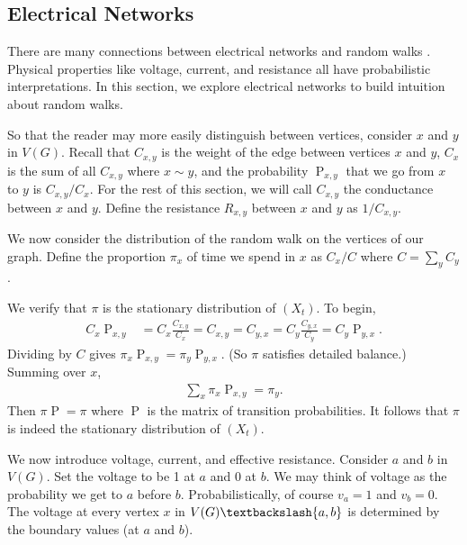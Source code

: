 \documentclass[12pt]{article}
\theoremstyle{definition}
\DeclareMathOperator{\pr}{\mathrm{P}}		     %
\begin{document}
\subsection{Electrical Networks \label{sec:electric}}

There are many connections between electrical networks
and random walks \cite{Bo98}.
Physical properties like voltage, current, and resistance
all have probabilistic interpretations.
In this section, we explore electrical networks to build intuition about 
random walks.

So that the reader may more easily distinguish between
vertices, consider $x$ and $y$ in $V(G)$.
Recall that $C_{x,y}$ is the weight of the edge
between vertices $x$ and $y$, $C_x$ is the sum
of all $C_{x,y}$ where $x \sim y$, and the probability $\pr_{x,y}$
that we go from $x$ to $y$ is $C_{x,y}/C_x$.
For the rest of this section, we will call $C_{x,y}$
the conductance between $x$ and $y$.
Define the resistance $R_{x,y}$ between $x$ and $y$
as $1/ C_{x,y}$.

We now consider the distribution of the random
walk on the vertices of our graph.
Define the proportion $\pi_x$ of time we spend in $x$
as $C_x/C$ where $C=\sum_y C_y$.

We verify that $\pi$ is the stationary distribution
of $(X_t)$.
To begin,
\begin{align}
C_x \pr_{x,y} &= C_x \frac{C_{x,y}}{C_x} = C_{x,y} = C_{y,x} 
= C_y \frac{C_{y,x}}{C_y} = C_y \pr_{y,x}. \nonumber
\end{align}
Dividing by $C$ gives $\pi_x \pr_{x,y} = \pi_y \pr_{y,x}$.
(So $\pi$ satisfies detailed balance.)
Summing over $x$,
\begin{align}
\sum_x \pi_x \pr_{x,y} = \pi_y . \nonumber
\end{align}
Then $\pi \pr = \pi$ where $\pr$ is the matrix of transition probabilities.
It follows that $\pi$ is indeed the stationary distribution of $(X_t)$.

We now introduce voltage, current, and effective resistance.
Consider $a$ and $b$ in $V(G)$.
Set the voltage to be 1 at $a$ and 0 at $b$.
We may think of voltage as the probability we get to $a$ before $b$.
Probabilistically, of course $v_a = 1$ and $v_b=0$.
The voltage at every vertex $x$ in  $V(G) \textbackslash \{a,b\}$
is determined by the boundary values (at $a$ and $b$).
\end{document}
